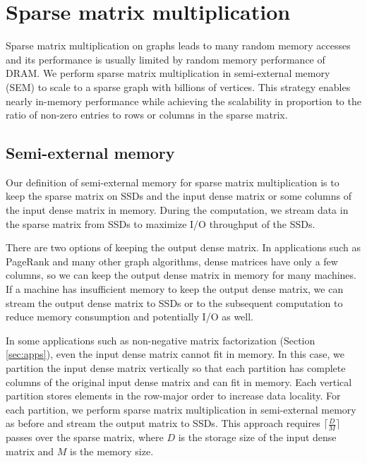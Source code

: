 \section{Sparse matrix multiplication} \label{sec:spmm}
Sparse matrix multiplication on graphs leads to many random memory
accesses and its performance is usually limited by random memory performance
of DRAM. We perform sparse matrix multiplication in semi-external memory (SEM)
to scale to a sparse graph with billions of vertices. This strategy enables
nearly in-memory performance while achieving the scalability in proportion
to the ratio of non-zero entries to rows or columns in the sparse matrix.

\subsection{Semi-external memory}
Our definition of semi-external memory for sparse matrix multiplication is
to keep the sparse matrix on SSDs and the input dense matrix or some columns
of the input dense matrix in memory. During the computation, we stream
data in the sparse matrix from SSDs to maximize I/O throughput of the SSDs.

There are two options of keeping the output dense matrix. In applications
such as PageRank and many other graph
algorithms, dense matrices have only a few columns, so we can keep the output
dense matrix in memory for many machines. If a machine has insufficient
memory to keep the output dense matrix, we can stream the output dense matrix
to SSDs or to the subsequent computation to reduce memory consumption and
potentially I/O as well.

In some applications such as non-negative matrix factorization (Section
\ref{sec:apps}), even the input dense matrix cannot fit in memory. In this case,
we partition the input dense matrix vertically so that each partition has
complete columns of the original input dense matrix and can fit in memory.
Each vertical partition stores elements in the row-major order to increase
data locality. For each partition, we perform sparse matrix multiplication
in semi-external memory as before and stream the output matrix to SSDs.
This approach requires $\lceil \frac{D}{M} \rceil$ passes over the sparse matrix,
where $D$ is the storage size of the input dense matrix and $M$ is the memory
size.

